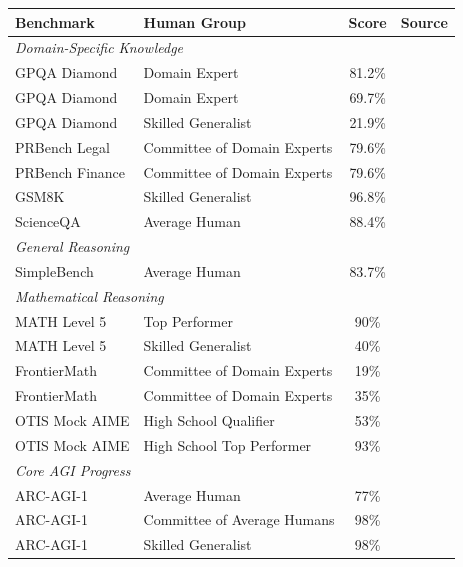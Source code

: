 \documentclass[letterpaper,twocolumn]{article}
\begin{document}
\begin{table}[ht]
\centering
\small
\begin{tabular}{llcl}
\toprule
\textbf{Benchmark} & \textbf{Human Group} & \textbf{Score} & \textbf{Source} \\
\midrule
\multicolumn{4}{l}{\textit{Domain-Specific Knowledge}} \\
GPQA Diamond & Domain Expert & 81.2\% & \citet{rein_gpqa_2023} \\
GPQA Diamond & Domain Expert & 69.7\% & \citet{openai_learning_2024}\\
GPQA Diamond & Skilled Generalist & 21.9\% & \citet{rein_gpqa_2023} \\
PRBench Legal & Committee of Domain Experts& 79.6\% & \citet{akyurek_prbench_2025} \\
PRBench Finance & Committee of Domain Experts& 79.6\% & \citet{akyurek_prbench_2025} \\
GSM8K & Skilled Generalist & 96.8\% & \citet{li_gsm-plus_2024} \\
ScienceQA & Average Human & 88.4\% & \citet{lu_learn_2022} \\
\midrule
\multicolumn{4}{l}{\textit{General Reasoning}} \\
SimpleBench & Average Human & 83.7\% & \citet{philip_simplebench_2024} \\
\midrule
\multicolumn{4}{l}{\textit{Mathematical Reasoning}} \\
MATH Level 5 & Top Performer & 90\% & \citet{hendrycks_measuring_2021} \\
MATH Level 5 & Skilled Generalist & 40\% & \citet{hendrycks_measuring_2021} \\
FrontierMath & Committee of Domain Experts& 19\% & \citet{epoch_ai_frontiermath_2025} \\
FrontierMath & Committee of Domain Experts& 35\% & \citet{epoch_ai_frontiermath_2025} \\
OTIS Mock AIME & High School Qualifier& 53\% & \citet{chen_otis_2025} \\
OTIS Mock AIME & High School Top Performer& 93\% & \citet{chen_otis_2025} \\
\midrule
\multicolumn{4}{l}{\textit{Core AGI Progress}} \\
ARC-AGI-1 & Average Human & 77\% & \citet{arc_prize_arc-agi-1_2019} \\
ARC-AGI-1 & Committee of Average Humans & 98\% & \citet{arc_prize_arc-agi-1_2019} \\
ARC-AGI-1 & Skilled Generalist & 98\% & \citet{arc_prize_arc-agi-1_2019} \\

\end{tabular}
\end{table}
\end{document}
